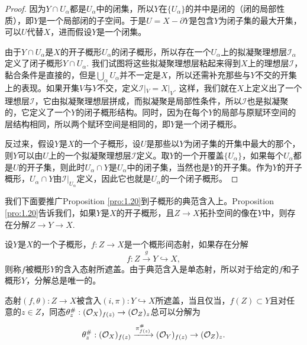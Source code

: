 \begin{proof}
	因为$Y\cap U_\alpha$都是$U_\alpha$中的闭集，所以$Y$在$\{U_\alpha\}$的并中是闭的（闭的局部性质），即$Y$是一个局部闭的子空间。于是$U=X-\partial Y$是包含$Y$为闭子集的最大开集，可以$U$代替$X$，进而假设$Y$是一个闭集。
	
	由于$Y\cap U_\alpha$是$X$的开子概形$U_\alpha$的闭子概形，所以存在一个$U_\alpha$上的拟凝聚理想层$\mathscr I_\alpha$定义了闭子概形$Y\cap U_\alpha$. 我们试图将这些拟凝聚理想层粘起来得到$X$上的理想层$\mathscr I$，黏合条件是直接的，但是$\bigcup_\alpha U_\alpha$并不一定是$X$，所以还需补充那些与$Y$不交的开集上的表现。如果开集$V$与$Y$不交，定义$\mathscr I|_V=X|_V$. 这样，我们就在$X$上定义出了一个理想层$\mathscr I$，它由拟凝聚理想层拼成，而拟凝聚是局部性条件，所以$\mathscr I$也是拟凝聚的，它定义了一个$Y$的闭子概形结构。同时，因为在每个$Y$的局部与原赋环空间的层结构相同，所以两个赋环空间是相同的，即$Y$是一个闭子概形。

	反过来，假设$Y$是$X$的一个子概形，设$U$是那些以$Y$为闭子集的开集中最大的那个，则$Y$可以由$U$上的一个拟凝聚理想层$\mathscr I$定义。取$Y$的一个开覆盖$\{U_\alpha\}$，如果每个$U_\alpha$都是$U$的开子集，则此时$U_\alpha\cap Y$是$U_\alpha$中的闭子集，当然也是$Y$的开子集。作为$Y$的开子概形，$U_\alpha\cap Y$由$\mathscr I|_{U_\alpha}$定义，因此它也就是$U_\alpha$的一个闭子概形。
\end{proof}

我们下面要推广Proposition \ref{pro:1.20}到子概形的典范含入上。Proposition \ref{pro:1.20}告诉我们，如果$Y$是$X$的开子概形，且$Z\to X$拓扑空间的像在$Y$中，则存在分解$Z\to Y\to X$. %

\begin{para}
设$Y$是$X$的一个子概形，$f:Z\to X$是一个概形间态射，如果存在分解
\[
	f:Z\xrightarrow{g} Y\hookrightarrow X,
\]
则称$f$被概形$Y$的含入态射所遮盖。由于典范含入是单态射，所以对于给定的$f$和子概形$Y$，分解总是唯一的。
\end{para}

\begin{pro}\label{pro:3.3.11}
态射$(f,\theta):Z\to X$被含入$(i,\pi):Y\hookrightarrow X$所遮盖，当且仅当，$f(Z)\subset Y$且对任意的$z\in Z$，同态$\theta^\#_z:(\mathcal{O}_{X})_{f(z)}\to (\mathcal{O}_{Z})_z$总可以分解为
\[
	\theta^\#_z:(\mathcal{O}_{X})_{f(z)}\xrightarrow{\pi^\#_{f(z)}} (\mathcal{O}_Y)_{f(z)}\to (\mathcal{O}_{Z})_z.
\]
\end{pro}

